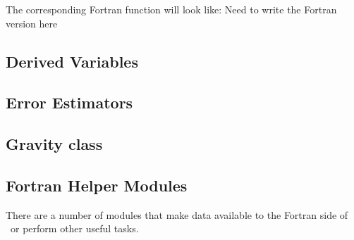 The corresponding Fortran function will look like:
{\color{red} Need to write the Fortran version here}


\subsection{Derived Variables}

\subsection{Error Estimators}


\subsection{Gravity class}


\subsection{Fortran Helper Modules}

There are a number of modules that make data available to the Fortran
side of \castro\ or perform other useful tasks.

